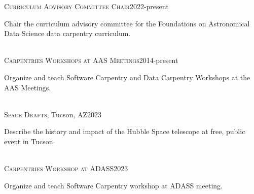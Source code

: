 \documentclass[10pt]{cv}
\begin{document}
\begin{llist}
\textsc{Curriculum Advisory Committee Chair}\hfill 2022-present\
\begin{minipage}[l]{0.7\textwidth}\vspace{0.15cm}
Chair the curriculum advisory committee for the Foundations on Astronomical Data Science data carpentry curriculum. \\
\end{minipage}\vspace{0.15cm}
\\
\textsc{Carpentries Workshops at AAS Meetings}\hfill 2014-present\
\begin{minipage}[l]{0.7\textwidth}\vspace{0.15cm}
Organize and teach Software Carpentry and Data Carpentry Workshops at the AAS Meetings. \\
\end{minipage}\vspace{0.15cm}
\\
\textsc{Space Drafts}, Tucson, AZ\hfill 2023\\
\begin{minipage}[l]{0.7\textwidth}\vspace{0.15cm}
Describe the history and impact of the Hubble Space telescope at free, public event in Tucson.\\
\end{minipage}\vspace{0.15cm}
\\
\textsc{Carpentries Workshop at ADASS}\hfill2023\
\begin{minipage}[l]{0.7\textwidth}\vspace{0.15cm}
Organize and teach Software Carpentry workshop at ADASS meeting.\\
\end{minipage}\vspace{0.15cm}

\end{llist}
\end{document}
